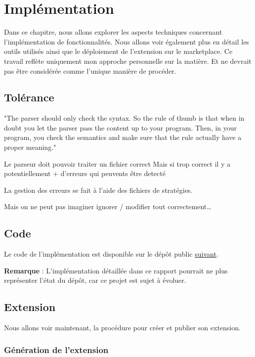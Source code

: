 \documentclass[
    iict, %
    il, %
]{heig-tb}
\begin{document}
\chapter{Implémentation}
Dans ce chapitre, nous allons explorer les aspects techniques concernant l'implémentation de fonctionnalités. Nous allons voir également plus en détail les outils utilisés ainsi que le déploiement de l'extension sur le marketplace.
Ce travail reflète uniquement mon approche personnelle sur la matière. Et ne devrait pas être considérée comme l'unique manière de procéder.

\section{Tolérance}

"The parser should only check the syntax. So the rule of thumb is that when in doubt you 
let the parser pass the content up to your program. Then, in your program, you check the semantics and make sure that the rule actually have a proper meaning."


Le parseur doit pouvoir traiter un fichier correct
Mais si trop correct il y a potentiellement + d'erreurs qui peuvents être detecté

La gestion des erreurs se fait à l'aide des fichiers de stratégies.

Mais on ne peut pas imaginer ignorer / modifier tout correctement\dots


\section{Code}
Le code de l'implémentation est disponible sur le dépôt public \href{https://github.com/vitorva/vscode-uon}{suivant}.

\textbf{Remarque} : L'implémentation détaillée dans ce rapport pourrait ne plus représenter l'état du dépôt, car ce projet est sujet à évoluer.

\section{Extension}
Nous allons voir maintenant, la procédure pour créer et publier son extension.


\subsection{Génération de l'extension}
\end{document}
